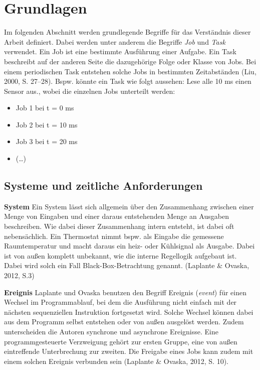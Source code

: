 \chapter{Grundlagen}
\label{ch:grundlagen}

Im folgenden Abschnitt werden grundlegende Begriffe f{\"u}r das Verst{\"a}ndnis dieser Arbeit definiert. Dabei werden unter anderem die Begriffe \emph{Job} und \emph{Task} verwendet. Ein Job ist eine bestimmte Ausf{\"u}hrung einer Aufgabe. Ein Task beschreibt auf der anderen Seite die dazugeh{\"o}rige Folge oder Klasse von Jobs. Bei einem periodischen Task entstehen solche Jobs in bestimmten Zeitabst{\"a}nden (Liu, 2000, S. 27--28). Bspw. k{\"o}nnte ein Task wie folgt aussehen: \glqq{}Lese alle 10 ms einen Sensor aus.\grqq{}, wobei die einzelnen Jobs unterteilt werden:

\begin{itemize}
\item Job 1 bei t = 0 ms
\item Job 2 bei t = 10 ms
\item Job 3 bei t = 20 ms
\item (\ldots{})
\end{itemize}
\section{Systeme und zeitliche Anforderungen}
\textbf{System} Ein System l{\"a}sst sich allgemein {\"u}ber den Zusammenhang zwischen einer Menge von Eingaben und einer daraus entstehenden Menge an Ausgaben beschreiben. Wie dabei dieser Zusammenhang intern entsteht, ist dabei oft nebens{\"a}chlich. Ein Thermostat nimmt bspw. als Eingabe die gemessene Raumtemperatur und macht daraus ein heiz- oder K{\"u}hlsignal als Ausgabe. Dabei ist von au{\ss}en komplett unbekannt, wie die interne Regellogik aufgebaut ist. Dabei wird solch ein Fall Black-Box-Betrachtung genannt. (Laplante \& Ovaska, 2012, S.3)

\textbf{Ereignis }Laplante und Ovaska benutzen den Begriff Ereignis (\emph{event}) f{\"u}r einen Wechsel im Programmablauf, bei dem die Ausf{\"u}hrung nicht einfach mit der n{\"a}chsten sequenziellen Instruktion fortgesetzt wird. Solche Wechsel k{\"o}nnen dabei aus dem Programm selbst entstehen oder von au{\ss}en ausgel{\"o}st werden. Zudem unterscheiden die Autoren synchrone und asynchrone Ereignisse. Eine programmgesteuerte Verzweigung geh{\"o}rt zur ersten Gruppe, eine von au{\ss}en eintreffende Unterbrechung zur zweiten. Die Freigabe eines Jobs kann zudem mit einem solchen Ereignis verbunden sein (Laplante \& Ovaska, 2012, S. 10).

